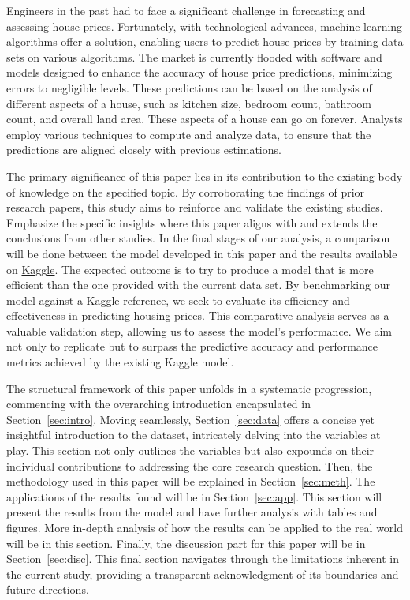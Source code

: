 \documentclass[12pt]{article}
\begin{document}
Engineers in the past had to face a significant challenge in forecasting and assessing house prices. Fortunately, with technological advances, machine learning algorithms offer a solution, enabling users to predict house prices by training data sets on various algorithms. The market is currently flooded with software and models designed to enhance the accuracy of house price predictions, minimizing errors to negligible levels. These predictions can be based on the analysis of different aspects of a house, such as kitchen size, bedroom count, bathroom count, and overall land area. These aspects of a house can go on forever. Analysts employ various techniques to compute and analyze data,  to ensure that the predictions are aligned closely with previous estimations. \cite{singh2021}


The primary significance of this paper lies in its contribution to the existing body of knowledge on the specified topic. By corroborating the findings of prior research papers, this study aims to reinforce and validate the existing studies. Emphasize the specific insights where this paper aligns with and extends the conclusions from other studies. In the final stages of our analysis, a comparison will be done between the model developed in this paper and the results available on \href{https://www.kaggle.com/code/ashydv/housing-price-prediction-linear-regression/notebook}{Kaggle}. The expected outcome is to try to produce a model that is more efficient than the one provided with the current data set. By benchmarking our model against a Kaggle reference, we seek to evaluate its efficiency and effectiveness in predicting housing prices. This comparative analysis serves as a valuable validation step, allowing us to assess the model's performance. We aim not only to replicate but to surpass the predictive accuracy and performance metrics achieved by the existing Kaggle model. 

The structural framework of this paper unfolds in a systematic progression, commencing with the overarching introduction encapsulated in Section~\ref{sec:intro}. Moving seamlessly, Section~\ref{sec:data} offers a concise yet insightful introduction to the dataset, intricately delving into the variables at play. This section not only outlines the variables but also expounds on their individual contributions to addressing the core research question. Then, the methodology used in this paper will be explained in Section~\ref{sec:meth}. The applications of the results found will be in Section~\ref{sec:app}. This section will present the results from the model and have further analysis with tables and figures. More in-depth analysis of how the results can be applied to the real world will be in this section. Finally, the discussion part for this paper will be in Section~\ref{sec:disc}. This final section navigates through the limitations inherent in the current study, providing a transparent acknowledgment of its boundaries and future directions. 
\end{document}
